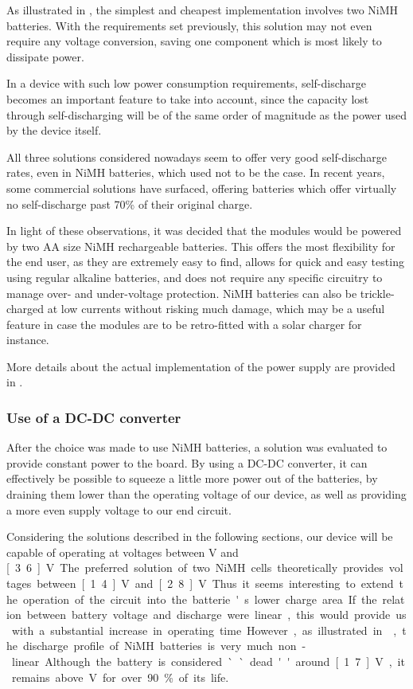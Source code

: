 As illustrated in , the simplest and cheapest
implementation involves two NiMH batteries. With the requirements set
previously, this solution may not even require any voltage conversion, saving
one component which is most likely to dissipate power.

In a device with such low power consumption requirements, self-discharge becomes
an important feature to take into account, since the capacity lost through
self-discharging will be of the same order of magnitude as the power used by the
device itself.

All three solutions considered nowadays seem to offer very good self-discharge
rates, even in NiMH batteries, which used not to be the case. In recent years,
some commercial solutions have surfaced, offering batteries which offer
virtually no self-discharge past 70\% of their original
charge\cite{testingeneloop}.

In light of these observations, it was decided that the modules would be powered
by two AA size NiMH rechargeable batteries. This offers the most flexibility for
the end user, as they are extremely easy to find, allows for quick and easy
testing using regular alkaline batteries, and does not require any specific
circuitry to manage over- and under-voltage protection. NiMH batteries can also
be trickle-charged at low currents without risking much damage, which may be a
useful feature in case the modules are to be retro-fitted with a solar charger
for instance.

More details about the actual implementation of the power supply are provided in
.

\subsubsection{Use of a DC-DC converter}
After the choice was made to use NiMH batteries, a solution was evaluated to
provide constant power to the board. By using a DC-DC converter, it can
effectively be possible to squeeze a little more power out of the batteries, by
draining them lower than the operating voltage of our device, as well as
providing a more even supply voltage to our end circuit.

Considering the solutions described in the following sections, our device will
be capable of operating at voltages between \unit[2]{V} and \unit[3.6]{V}. The
preferred solution of two NiMH cells theoretically provides voltages between
\unit[1.4]{V} and \unit[2.8]{V}. Thus it seems interesting to extend the
operation of the circuit into the batterie's lower charge area. If the relation
between battery voltage and discharge were linear, this would provide us with a
substantial increase in operating time. However, as illustrated in
, the discharge profile of NiMH batteries is very much
non-linear. Although the battery is considered ``dead'' around \unit[1.7]{V}, it
remains above \unit[2]{V} for over 90\% of its life.

